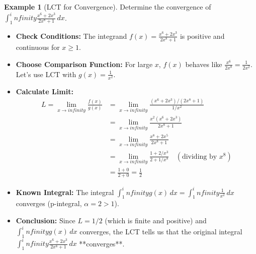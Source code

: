 \documentclass[11pt]{article}
\def\infty{infinity}%
\theoremstyle{definition}
\newtheorem{example}[theorem]{Example}
\newcommand{\dx}{\, dx} %
\begin{document}
\begin{example}[LCT for Convergence] \label{ex:poly_ratio_conv}
    Determine the convergence of $\int_1^\infty \frac{x^6 + 2x^3}{2x^8 + 1} \dx$.
    \begin{itemize}
        \item \textbf{Check Conditions:} The integrand $f(x) = \frac{x^6 + 2x^3}{2x^8 + 1}$ is positive and continuous for $x \ge 1$.
        \item \textbf{Choose Comparison Function:} For large $x$, $f(x)$ behaves like $\frac{x^6}{2x^8} = \frac{1}{2x^2}$. Let's use LCT with $g(x) = \frac{1}{x^2}$.
        \item \textbf{Calculate Limit:}
          \begin{align*} L = \lim_{x \to \infty} \frac{f(x)}{g(x)} &= \lim_{x \to \infty} \frac{(x^6 + 2x^3)/(2x^8 + 1)}{1/x^2} \\ &= \lim_{x \to \infty} \frac{x^2(x^6 + 2x^3)}{2x^8 + 1} \\ &= \lim_{x \to \infty} \frac{x^8 + 2x^5}{2x^8 + 1} \\ &= \lim_{x \to \infty} \frac{1 + 2/x^3}{2 + 1/x^8} \quad (\text{dividing by } x^8) \\ &= \frac{1+0}{2+0} = \frac{1}{2} \end{align*}
        \item \textbf{Known Integral:} The integral $\int_1^\infty g(x) \dx = \int_1^\infty \frac{1}{x^2} \dx$ converges (p-integral, $\alpha=2 > 1$).
        \item \textbf{Conclusion:} Since $L = 1/2$ (which is finite and positive) and $\int_1^\infty g(x) \dx$ converges, the LCT tells us that the original integral $\int_1^\infty \frac{x^6 + 2x^3}{2x^8 + 1} \dx$ **converges**.
    \end{itemize}
\end{example}
\end{document}
